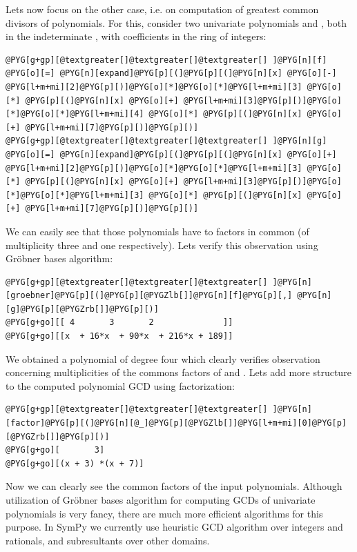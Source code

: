 Lets now focus on the other case, i.e. on computation of greatest common divisors of polynomials.
For this, consider two univariate polynomials  and , both in the indeterminate ,
with coefficients in the ring of integers:

\begin{Verbatim}[commandchars=@\[\]]
@PYG[g+gp][@textgreater[]@textgreater[]@textgreater[] ]@PYG[n][f] @PYG[o][=] @PYG[n][expand]@PYG[p][(]@PYG[p][(]@PYG[n][x] @PYG[o][-] @PYG[l+m+mi][2]@PYG[p][)]@PYG[o][*]@PYG[o][*]@PYG[l+m+mi][3] @PYG[o][*] @PYG[p][(]@PYG[n][x] @PYG[o][+] @PYG[l+m+mi][3]@PYG[p][)]@PYG[o][*]@PYG[o][*]@PYG[l+m+mi][4] @PYG[o][*] @PYG[p][(]@PYG[n][x] @PYG[o][+] @PYG[l+m+mi][7]@PYG[p][)]@PYG[p][)]
@PYG[g+gp][@textgreater[]@textgreater[]@textgreater[] ]@PYG[n][g] @PYG[o][=] @PYG[n][expand]@PYG[p][(]@PYG[p][(]@PYG[n][x] @PYG[o][+] @PYG[l+m+mi][2]@PYG[p][)]@PYG[o][*]@PYG[o][*]@PYG[l+m+mi][3] @PYG[o][*] @PYG[p][(]@PYG[n][x] @PYG[o][+] @PYG[l+m+mi][3]@PYG[p][)]@PYG[o][*]@PYG[o][*]@PYG[l+m+mi][3] @PYG[o][*] @PYG[p][(]@PYG[n][x] @PYG[o][+] @PYG[l+m+mi][7]@PYG[p][)]@PYG[p][)]
\end{Verbatim}
\noindent
We can easily see that those polynomials have to factors in common (of multiplicity three
and one respectively). Lets verify this observation using Gröbner bases algorithm:

\begin{Verbatim}[commandchars=@\[\]]
@PYG[g+gp][@textgreater[]@textgreater[]@textgreater[] ]@PYG[n][groebner]@PYG[p][(]@PYG[p][@PYGZlb[]]@PYG[n][f]@PYG[p][,] @PYG[n][g]@PYG[p][@PYGZrb[]]@PYG[p][)]
@PYG[g+go][[ 4       3       2              ]]
@PYG[g+go][[x  + 16*x  + 90*x  + 216*x + 189]]
\end{Verbatim}
\noindent
We obtained a polynomial of degree four which clearly verifies observation concerning
multiplicities of the commons factors of  and . Lets add more structure to
the computed polynomial GCD using factorization:

\begin{Verbatim}[commandchars=@\[\]]
@PYG[g+gp][@textgreater[]@textgreater[]@textgreater[] ]@PYG[n][factor]@PYG[p][(]@PYG[n][@_]@PYG[p][@PYGZlb[]]@PYG[l+m+mi][0]@PYG[p][@PYGZrb[]]@PYG[p][)]
@PYG[g+go][       3]
@PYG[g+go][(x + 3) *(x + 7)]
\end{Verbatim}
\noindent
Now we can clearly see the common factors of the input polynomials. Although utilization of
Gröbner bases algorithm for computing GCDs of univariate polynomials is very fancy, there
are much more efficient algorithms for this purpose. In SymPy we currently use heuristic GCD
algorithm over integers and rationals, and subresultants over other domains.

